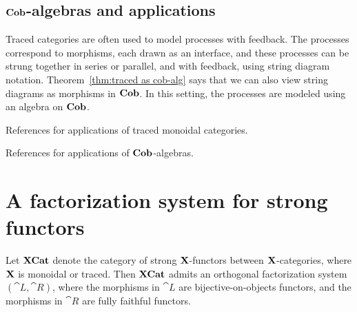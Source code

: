 \documentclass[12pt,oneside,article,draft]{memoir}
\begin{document}
\subsection{$\mathbf{Cob}$-algebras and applications}

Traced categories are often used to model processes with feedback. The processes correspond to morphisms, each drawn as an interface, and these processes can be strung together in series or parallel, and with feedback, using string diagram notation. Theorem~\ref{thm:traced as cob-alg} says that we can also view string diagrams as morphisms in $\mathbf{Cob}$. In this setting, the processes are modeled using an algebra on $\mathbf{Cob}$.

References for applications of traced monoidal categories.

References for applications of $\mathbf{Cob}$-algebras.

\section{A factorization system for strong functors}

\begin{lemma}\label{lemma:factorization system}

Let $\mathbf{XCat}$ denote the category of strong $\mathbf{X}$-functors between $\mathbf{X}$-categories,  where $\mathbf{X}$ is monoidal or traced. Then $\mathbf{XCat}$ admits an orthogonal factorization system $(\cat{L},\cat{R})$, where the morphisms in $\cat{L}$ are bijective-on-objects functors, and the morphisms in $\cat{R}$ are fully faithful functors.

\end{lemma}
\end{document}
